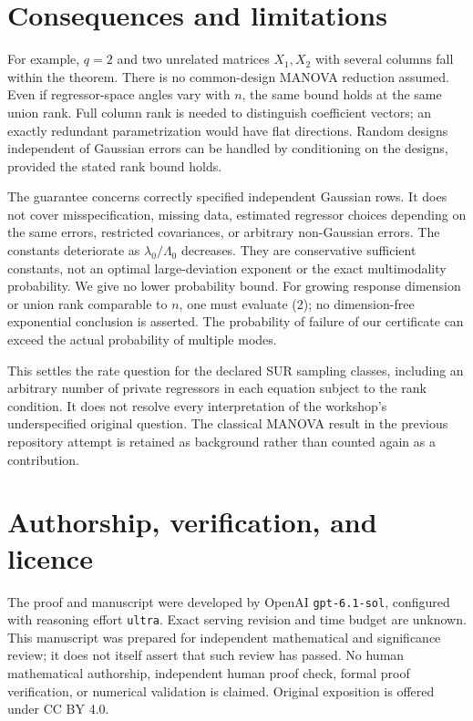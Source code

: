 \documentclass[11pt]{article}
\begin{document}
\section{Consequences and limitations}

For example, \(q=2\) and two unrelated matrices \(X_1,X_2\) with
several columns fall within the theorem. There is no common-design
MANOVA reduction assumed. Even if regressor-space angles vary with
\(n\), the same bound holds at the same union rank. Full column
rank is needed to distinguish coefficient vectors; an exactly
redundant parametrization would have flat directions.
Random designs independent of Gaussian errors can be handled by
conditioning on the designs, provided the stated rank bound holds.

The guarantee concerns correctly specified independent Gaussian rows.
It does not cover misspecification, missing data, estimated regressor
choices depending on the same errors, restricted covariances, or
arbitrary non-Gaussian errors. The constants deteriorate as
\(\lambda_0/\Lambda_0\) decreases. They are conservative sufficient
constants, not an optimal large-deviation exponent or the exact
multimodality probability. We give no lower probability bound.
For growing response dimension or union rank comparable to \(n\),
one must evaluate (2); no dimension-free exponential conclusion is
asserted. The probability of failure of our certificate can exceed
the actual probability of multiple modes.

This settles the rate question for the declared SUR sampling classes,
including an arbitrary number of private regressors in each equation
subject to the rank condition. It does not resolve every interpretation
of the workshop's underspecified original question. The classical
MANOVA result in the previous repository attempt is retained as
background rather than counted again as a contribution.

\section*{Authorship, verification, and licence}

The proof and manuscript were developed by OpenAI
\texttt{gpt-6.1-sol}, configured with reasoning effort \texttt{ultra}.
Exact serving revision and time budget are unknown. This manuscript
was prepared for independent mathematical and significance review;
it does not itself assert that such review has passed.
No human mathematical authorship, independent human proof check,
formal proof verification, or numerical validation is claimed.
Original exposition is offered under CC BY 4.0.
\end{document}
